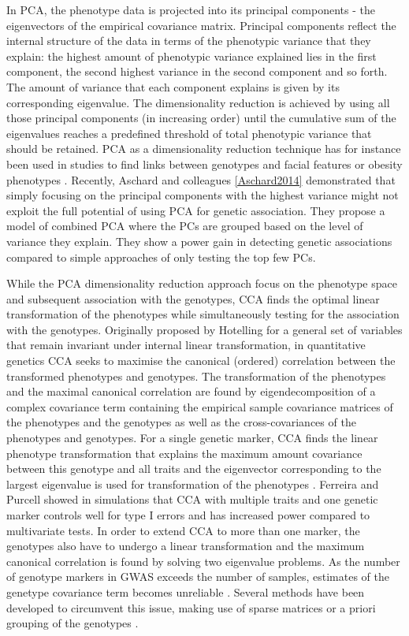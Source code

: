 In PCA, the phenotype data is projected into its principal components - the eigenvectors of the empirical covariance matrix. Principal components reflect the internal structure of the data in terms of the phenotypic variance that they explain: the highest amount of phenotypic variance explained lies in the first component, the second highest variance in the second component and so forth. The amount of variance that each component explains is given by its corresponding eigenvalue. The dimensionality reduction is achieved by using all those principal components (in increasing order) until the cumulative sum of the eigenvalues reaches a predefined threshold of total phenotypic variance that should be retained. PCA as a dimensionality reduction technique has for instance been used in studies to find links between genotypes and facial features or obesity phenotypes \citep{Liu2012,Claes2014,He2008}. Recently, Aschard and colleagues \ref{Aschard2014} demonstrated that simply focusing on the principal components with the highest variance might not exploit the full potential of using PCA for genetic association. They propose a model of combined PCA where the PCs are grouped based on the level of variance they explain. They show a power gain in detecting genetic associations compared to simple approaches of only testing the top few PCs.

While the PCA dimensionality reduction approach focus on the phenotype space and subsequent association with the genotypes, CCA finds the optimal linear transformation of the phenotypes while simultaneously testing for the association with the genotypes. Originally proposed by Hotelling for a general set of variables that remain invariant under internal linear transformation\citeyear{Hotelling1936}, in quantitative genetics CCA seeks to maximise the canonical (ordered) correlation  between the transformed phenotypes and genotypes. The transformation of the phenotypes and the maximal canonical correlation are found by eigendecomposition of a complex covariance term containing the empirical sample covariance matrices of the phenotypes and the genotypes as well as the cross-covariances of the phenotypes and genotypes. For a single genetic marker, CCA finds the linear phenotype transformation that explains the maximum amount covariance between this genotype and all traits and the eigenvector corresponding to the largest eigenvalue is used for transformation of the phenotypes \citep{Yang2102}. Ferreira and Purcell \citeyear{Ferreira2009} showed in simulations that CCA with multiple traits and one genetic marker controls well for type I errors and has increased power compared to multivariate tests. In order to extend CCA to more than one marker, the genotypes also have to undergo a linear transformation and the maximum canonical correlation is found by solving two eigenvalue problems. As the number of genotype markers in GWAS exceeds the number of samples, estimates of the genetype covariance term becomes unreliable \citep{Schaefer2005}. Several methods have been developed to circumvent this issue, making use of sparse matrices \citep{Parkhomenko2009} or a priori grouping of the genotypes \citep{Naylor2010}. 


